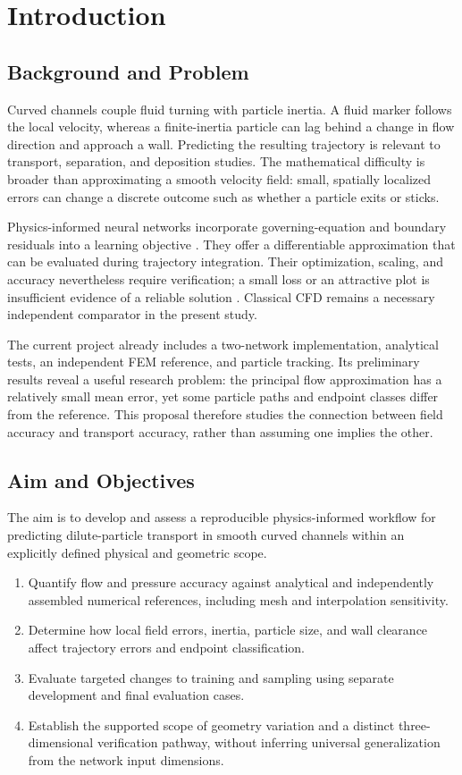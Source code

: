\chapter{Introduction}
\label{ch:introduction}
\section{Background and Problem}
Curved channels couple fluid turning with particle inertia. A fluid marker
follows the local velocity, whereas a finite-inertia particle can lag behind
a change in flow direction and approach a wall. Predicting the resulting
trajectory is relevant to transport, separation, and deposition studies.
The mathematical difficulty is broader than approximating a smooth velocity
field: small, spatially localized errors can change a discrete outcome such
as whether a particle exits or sticks.

Physics-informed neural networks incorporate governing-equation and boundary
residuals into a learning objective \cite{raissi2019,karniadakis2021}. They
offer a differentiable approximation that can be evaluated during trajectory
integration. Their optimization, scaling, and accuracy nevertheless require
verification; a small loss or an attractive plot is insufficient evidence
of a reliable solution \cite{wang2021,wang2022}. Classical CFD remains a
necessary independent comparator in the present study.

The current project already includes a two-network implementation, analytical
tests, an independent FEM reference, and particle tracking. Its preliminary
results reveal a useful research problem: the principal flow approximation
has a relatively small mean error, yet some particle paths and endpoint
classes differ from the reference. This proposal therefore studies the
connection between field accuracy and transport accuracy, rather than
assuming one implies the other.

\section{Aim and Objectives}
The aim is to develop and assess a reproducible physics-informed workflow
for predicting dilute-particle transport in smooth curved channels within
an explicitly defined physical and geometric scope.
\begin{enumerate}[label=O\arabic*.]
\item Quantify flow and pressure accuracy against analytical and independently
assembled numerical references, including mesh and interpolation sensitivity.
\item Determine how local field errors, inertia, particle size, and wall
clearance affect trajectory errors and endpoint classification.
\item Evaluate targeted changes to training and sampling using separate
development and final evaluation cases.
\item Establish the supported scope of geometry variation and a distinct
three-dimensional verification pathway, without inferring universal
generalization from the network input dimensions.
\end{enumerate}

